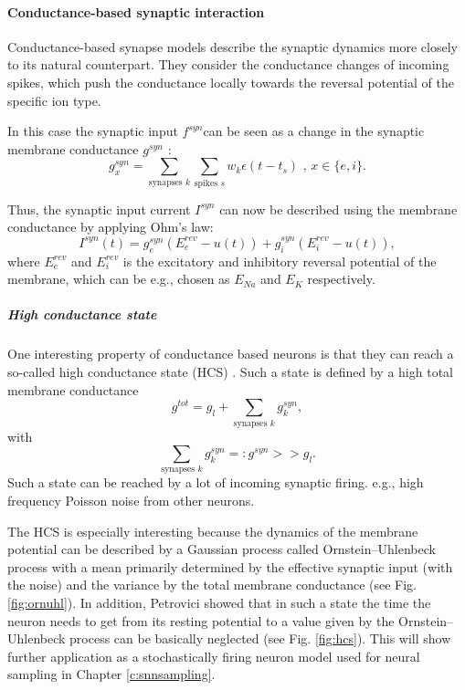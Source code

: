 \paragraph{Conductance-based synaptic interaction} \label{c:coba}
Conductance-based synapse models describe the synaptic dynamics more closely to its natural counterpart. They consider the conductance changes of incoming spikes, which push the conductance locally towards the reversal potential of the specific ion type. 

In this case the synaptic input $f^{syn} $can be seen as a change in the synaptic membrane conductance $g^{syn}$ :
\[
g_x^{syn} = \sum_{\text{synapses } k } \sum_{\text{spikes } s} w_k \epsilon(t - t_s) \text{ ,      } x \in \{e, i\}.
\]

Thus, the synaptic input current $I^{syn}$ can now be described using the membrane conductance by applying Ohm's law:
\[
I^{syn}(t) = g_e^{syn} (E_e^{rev} - u(t)) + g_i^{syn} (E_i^{rev} - u(t)),
\]
where $E_e^{rev}$ and $E_i^{rev}$ is the excitatory and inhibitory reversal potential of the membrane, which can be e.g., chosen as $E_{Na}$ and $E_{K}$ respectively.  

\subparagraph{High conductance state} \label{c:hcs}
One interesting property of conductance based neurons is that they can reach a so-called high conductance state (HCS) \cite{Petrovici2016}. Such a state is defined by a high total membrane conductance 
\[
g^{tot} = g_l + \sum_{\text{synapses } k} g_k^{syn},
\]
with 
\[
\sum_{\text{synapses } k} g_k^{syn} =: g^{syn} >> g_l .
\]
Such a state can be reached by a lot of incoming synaptic firing. e.g., high frequency Poisson noise from other neurons. 

The HCS is especially interesting because the dynamics of the membrane potential can be described by a Gaussian process called Ornstein–Uhlenbeck process with a mean primarily determined by the effective synaptic input (with the noise) and the variance by the total membrane conductance (see Fig. \ref{fig:ornuhl}).
In addition, Petrovici showed that in such a state the time the neuron needs to get from its resting potential to a value given by the Ornstein–Uhlenbeck process can be basically neglected (see Fig. \ref{fig:hcs}).
This will show further application as a stochastically firing neuron model used for neural sampling  in Chapter \ref{c:snnsampling}.

